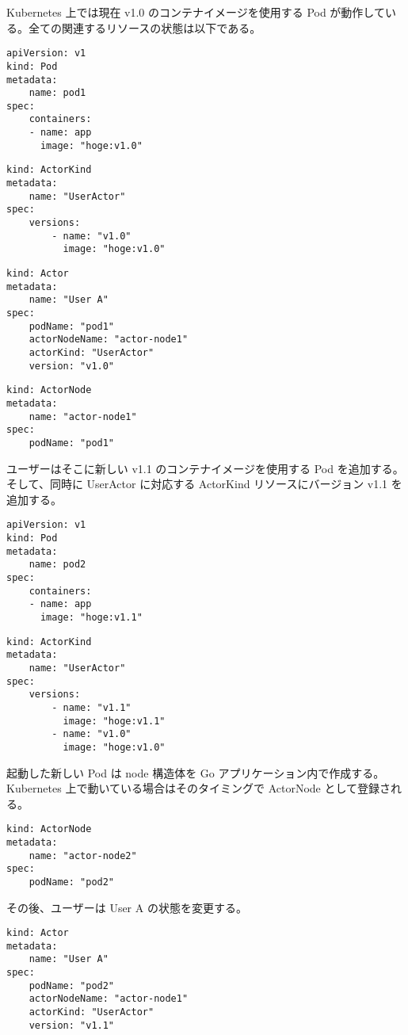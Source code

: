 Kubernetes 上では現在 v1.0 のコンテナイメージを使用する Pod
が動作している。全ての関連するリソースの状態は以下である。

\begin{verbatim}
apiVersion: v1
kind: Pod
metadata:
    name: pod1
spec:
    containers:
    - name: app
      image: "hoge:v1.0"
\end{verbatim}

\begin{verbatim}
kind: ActorKind
metadata:
    name: "UserActor"
spec:
    versions:
        - name: "v1.0"
          image: "hoge:v1.0"
\end{verbatim}

\begin{verbatim}
kind: Actor
metadata:
    name: "User A"
spec:
    podName: "pod1"
    actorNodeName: "actor-node1"
    actorKind: "UserActor"
    version: "v1.0"
\end{verbatim}

\begin{verbatim}
kind: ActorNode
metadata:
    name: "actor-node1"
spec:
    podName: "pod1"
\end{verbatim}

ユーザーはそこに新しい v1.1 のコンテナイメージを使用する Pod
を追加する。そして、同時に UserActor に対応する ActorKind
リソースにバージョン v1.1 を追加する。

\begin{verbatim}
apiVersion: v1
kind: Pod
metadata:
    name: pod2
spec:
    containers:
    - name: app
      image: "hoge:v1.1"
\end{verbatim}

\begin{verbatim}
kind: ActorKind
metadata:
    name: "UserActor"
spec:
    versions:
        - name: "v1.1"
          image: "hoge:v1.1"
        - name: "v1.0"
          image: "hoge:v1.0"
\end{verbatim}

起動した新しい Pod は node 構造体を Go
アプリケーション内で作成する。Kubernetes
上で動いている場合はそのタイミングで ActorNode として登録される。

\begin{verbatim}
kind: ActorNode
metadata:
    name: "actor-node2"
spec:
    podName: "pod2"
\end{verbatim}

その後、ユーザーは User A の状態を変更する。

\begin{verbatim}
kind: Actor
metadata:
    name: "User A"
spec:
    podName: "pod2"
    actorNodeName: "actor-node1"
    actorKind: "UserActor"
    version: "v1.1"
\end{verbatim}

